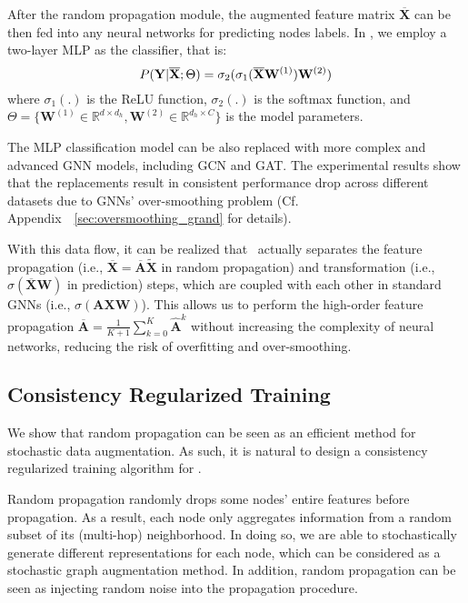 {
After the random propagation module, the augmented feature matrix $\overline{\mathbf{X}}$ can be then fed into any neural networks for predicting nodes labels. 
In \model, we employ a two-layer MLP as the classifier, that is:
\begin{equation}
\small
\label{equ:mlp}
    P(\mathbf{Y}|\overline{\mathbf{X}};\Theta) = \sigma_2(\sigma_1(\overline{\mathbf{X}}\mathbf{W}^{(1)})\mathbf{W}^{(2)})
\end{equation}
where $\sigma_1(.)$ is the ReLU function, $\sigma_2(.)$ is the softmax function, and $\Theta=\{\mathbf{W}^{(1)} \in \mathbb{R}^{d \times d_h}, \mathbf{W}^{(2)} \in \mathbb{R}^{d_h \times C}\}$ is the model parameters. 


The MLP classification model can be also replaced with more complex and advanced GNN models, including GCN and GAT. 
The experimental results show that the replacements result in consistent performance drop across different datasets due to GNNs' over-smoothing problem (Cf. Appendix~~\ref{sec:oversmoothing_grand} for details). 


With this data flow, it can be realized that \model\ actually separates the feature propagation (i.e., $\overline{\mathbf{X}} = \overline{\mathbf{A}} \widetilde{\mathbf{X}}$ in random propagation) and transformation (i.e., $\sigma(\overline{\mathbf{X}} \mathbf{W})$ in prediction) steps, which are coupled with each other in standard GNNs (i.e., $\sigma(\mathbf{AX} \mathbf{W})$). 
This allows us to perform the high-order feature propagation $\overline{\mathbf{A}} =  \frac{1}{K+1}\sum_{k=0}^K\hat{\mathbf{A}}^k$ without increasing the complexity of neural networks, reducing the risk of overfitting and over-smoothing. 







\subsection{Consistency Regularized Training}
We show that random propagation can be seen as an efficient method for stochastic data augmentation. 
As such, it is natural to design a consistency regularized training algorithm for \model. 
  
  

Random propagation randomly drops some nodes' entire features before propagation. 
As a result, each node only aggregates information from a random subset of its (multi-hop) neighborhood. 
In doing so, we are able to stochastically generate different representations for each node, which can be considered as a stochastic graph augmentation method. 
In addition, random propagation can be seen as injecting random noise into the propagation procedure. 


}
